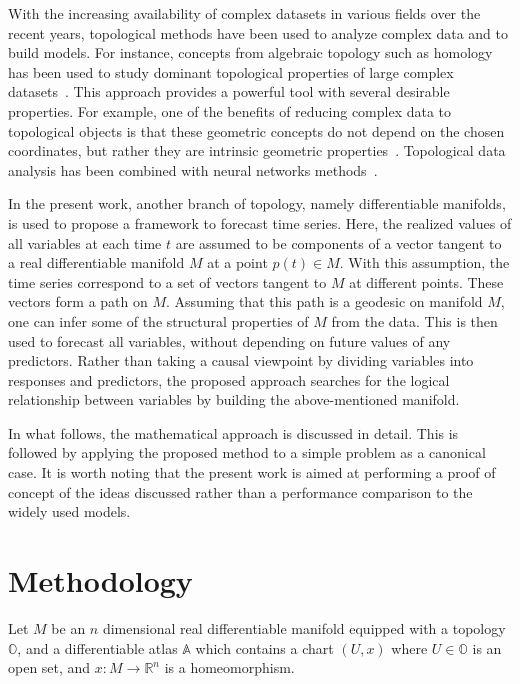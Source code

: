\documentclass[a4paper,11pt]{elsarticle}
\begin{document}
With the increasing availability of complex datasets in various fields
over the recent years, topological methods have been used to analyze
complex data and to build models. For instance, concepts from
algebraic topology such as homology has been used to study dominant
topological properties of large complex datasets~\cite{carlsson-2009,
  bubenik-2015, wasserman-2018}. This approach provides a powerful
tool with several desirable properties. For example, one of the
benefits of reducing complex data to topological objects is that these
geometric concepts do not depend on the chosen coordinates, but rather
they are intrinsic geometric
properties~\cite{carlsson-2009}. Topological data analysis has been
combined with neural networks methods~\cite{carlsson-gabrielsson-2020}.

In the present work, another branch of topology, namely differentiable
manifolds, is used to propose a framework to forecast time
series. Here, the realized values of all variables at each time $t$
are assumed to be components of a vector tangent to a real
differentiable manifold $M$ at a point $p(t) \in M$. With this
assumption, the time series correspond to a set of vectors tangent to
$M$ at different points. These vectors form a path on $M$. Assuming
that this path is a geodesic on manifold $M$, one can infer some of
the structural properties of $M$ from the data. This is then used to
forecast all variables, without depending on future values of any
predictors. Rather than taking a causal viewpoint by dividing
variables into responses and predictors, the proposed approach
searches for the logical relationship between variables by building
the above-mentioned manifold.

In what follows, the mathematical approach is discussed in detail. This
is followed by applying the proposed method to a simple problem as a
canonical case. It is worth noting that the present work is aimed at
performing a proof of concept of the ideas discussed rather than
a performance comparison to the widely used models.

\section{Methodology}
\label{section:methodology}

Let $M$ be an $n$ dimensional real differentiable manifold equipped
with a topology $\mathbb{O}$, and a differentiable atlas $\mathbb{A}$
which contains a chart $(U, x)$ where $U \in \mathbb{O}$ is an open
set, and $x: M \to \mathbb{R}^{n}$ is a homeomorphism.
\end{document}
